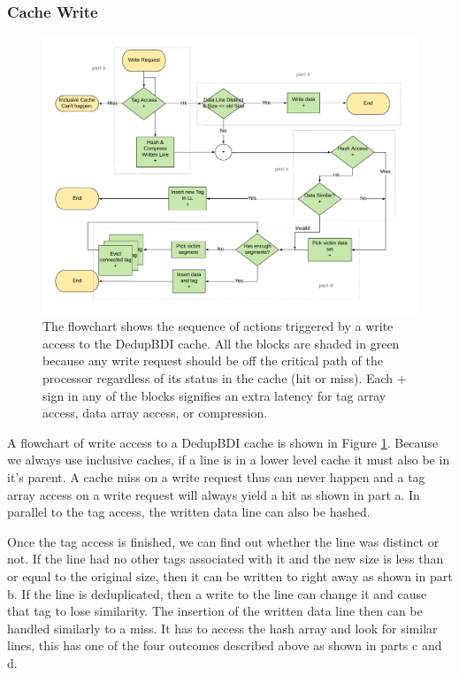 \subsubsection{Cache Write}
\begin{figure}
    \includegraphics[width=\textwidth]{DedupBDI_Write.pdf}
    \caption[DedupBDI Write]{The flowchart shows the sequence of actions triggered by a write access to the DedupBDI cache. All the blocks are shaded in green because any write request should be off the critical path of the processor regardless of its status in the cache (hit or miss). Each + sign in any of the blocks signifies an extra latency for tag array access, data array access, or compression.}
    \label{fig:DedupBDI_Write}
\end{figure}
A flowchart of write access to a DedupBDI cache is shown in Figure \ref{fig:DedupBDI_Write}. Because we always use inclusive caches, if a line is in a lower level cache it must also be in it's parent. A cache miss on a write request thus can never happen and a tag array access on a write request will always yield a hit as shown in part a. In parallel to the tag access, the written data line can also be hashed.\par
Once the tag access is finished, we can find out whether the line was distinct or not. If the line had no other tags associated with it and the new size is less than or equal to the original size, then it can be written to right away as shown in part b. If the line is deduplicated, then a write to the line can change it and cause that tag to lose similarity. The insertion of the written data line then can be handled similarly to a miss. It has to access the hash array and look for similar lines, this has one of the four outcomes described above as shown in parts c and d.


